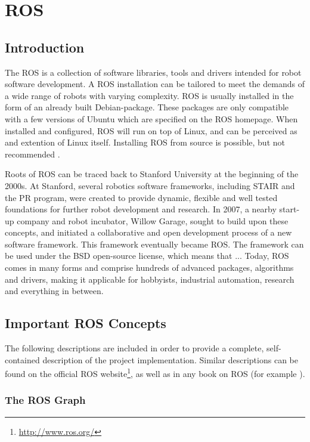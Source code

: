 \section{ROS}

\subsection{Introduction}

The \ac{ROS} is a collection of software libraries, tools and drivers intended for robot software development. A \ac{ROS} installation can be tailored to meet the demands of a wide range of robots with varying complexity. \ac{ROS} is usually installed in the form of an already built Debian-package. These packages are only compatible with a few versions of Ubuntu which are specified on the \ac{ROS} homepage. When installed and configured, \ac{ROS} will run on top of Linux, and can be perceived as and extention of Linux itself. Installing \ac{ROS} from source is possible, but not recommended \cite{ROS_install}.

Roots of \ac{ROS} can be traced back to Stanford University at the beginning of the 2000s. At Stanford, several robotics software frameworks, including \ac{STAIR} and the \ac{PR} program, were created to provide dynamic, flexible and well tested foundations for further robot development and research. In 2007, a nearby start-up company and robot incubator, Willow Garage, sought to build upon these concepts, and initiated a collaborative and open development process of a new software framework. This framework eventually became \ac{ROS}\cite{ROS_history}\cite{rosbook15}. The framework can be used under the BSD open-source license, which means that ...\cite{BCD_license} Today, \ac{ROS} comes in many forms and comprise hundreds of advanced packages, algorithms and drivers, making it applicable for hobbyists, industrial automation, research and everything in between. 

\subsection{Important ROS Concepts}

The following descriptions are included in order to provide a complete, self-contained description of the project implementation. Similar descriptions can be found on the official \ac{ROS} website\footnote{\url{http://www.ros.org/}}, as well as in any book on \ac{ROS} (for example \cite{rosbook15}). 

\subsubsection{The ROS Graph}

